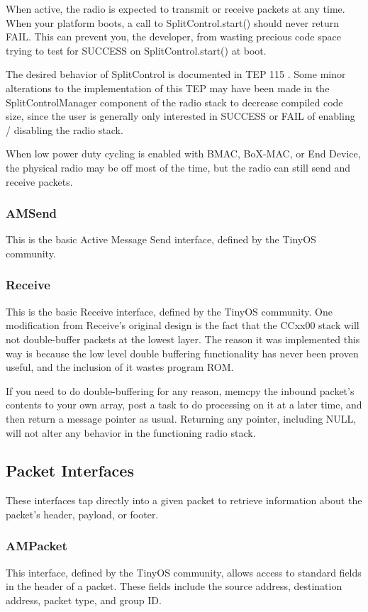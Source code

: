 \documentclass{article}
\begin{document}
When active, the radio is expected to transmit or receive packets at any time. 
When your platform boots, a call to SplitControl.start() should never return FAIL.  
This can prevent you, the developer, from wasting precious code space trying to test 
for SUCCESS on SplitControl.start() at boot.

The desired behavior of SplitControl is documented in TEP 115 \cite{tep115}. Some minor alterations
to the implementation of this TEP may have been made in the SplitControlManager component
of the radio stack to decrease compiled code size, since the user is generally only interested
in SUCCESS or FAIL of enabling / disabling the radio stack. 

When low power duty cycling is enabled with BMAC, BoX-MAC, or End Device, the physical 
radio may be off most of the time, but the radio can still send and receive packets.

\subsubsection{AMSend}
This is the basic Active Message Send interface, defined by the TinyOS community.

\subsubsection{Receive}
This is the basic Receive interface, defined by the TinyOS community. One modification
from Receive's original design is the fact that the CCxx00 stack will not double-buffer packets
at the lowest layer. The reason it was implemented this way is because the low level
double buffering functionality has never been proven useful, and the inclusion of 
it wastes program ROM.

If you need to do double-buffering for any reason, memcpy the inbound packet's contents to
your own array, post a task to do processing on it at a later time, and then return a message 
pointer as usual. Returning any pointer, including NULL, will not alter any behavior in the 
functioning radio stack.

\subsection{Packet Interfaces}
These interfaces tap directly into a given packet to retrieve information about the packet's
header, payload, or footer. 

\subsubsection{AMPacket}
This interface, defined by the TinyOS community, allows access to standard fields in the
header of a packet. These fields include the source address, destination address, packet
type, and group ID. 
\end{document}
